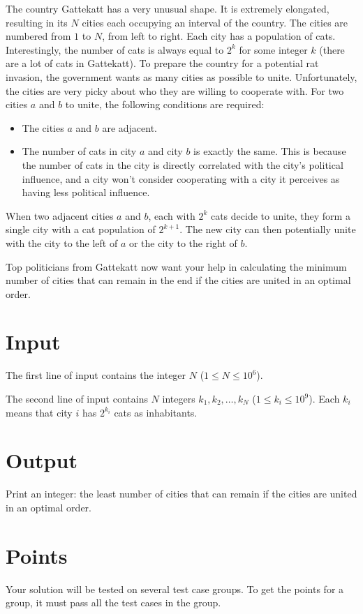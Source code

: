 \noindent
The country Gattekatt has a very unusual shape. It is extremely elongated, resulting in its $N$ cities each occupying an interval of the country.
The cities are numbered from $1$ to $N$, from left to right. Each city has a population of cats. Interestingly, the number of 
cats is always equal to $2^k$ for some integer $k$ (there are a lot of cats in Gattekatt).
To prepare the country for a potential rat invasion, the government wants as many cities as possible to unite.
Unfortunately, the cities are very picky about who they are willing to cooperate with. For two cities $a$ and $b$ to unite, the following conditions are required:

\begin{itemize}
  \item The cities $a$ and $b$ are adjacent. 
  \item The number of cats in city $a$ and city $b$ is exactly the same. This is because the number of cats in the city is
  directly correlated with the city's political influence, and a city won't consider cooperating with a city it perceives as having less political influence.
\end{itemize}

When two adjacent cities $a$ and $b$, each with $2^k$ cats decide to unite, they form a single city with a cat population of $2^{k+1}$.
The new city can then potentially unite with the city to the left of $a$ or the city to the right of $b$.

Top politicians from Gattekatt now want your help in calculating the minimum number of cities that can remain in the end if
the cities are united in an optimal order.

\section*{Input}
The first line of input contains the integer $N$ ($1 \leq N \leq 10^6$).

The second line of input contains $N$ integers $k_1, k_2, \dots, k_N$ ($1 \leq k_i \leq 10^9$).
Each $k_i$ means that city $i$ has $2^{k_i}$ cats as inhabitants. 

\section*{Output}
Print an integer: the least number of cities that can remain if the cities are united in an optimal order.

\section*{Points}
Your solution will be tested on several test case groups.
To get the points for a group, it must pass all the test cases in the group.

